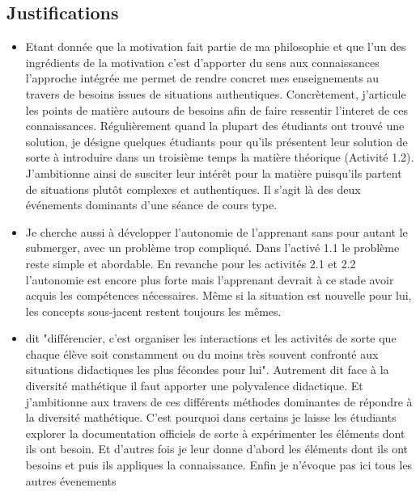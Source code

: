 \subsection{Justifications}
\begin{itemize}
    \item Etant donnée que la motivation fait partie de ma philosophie et que l’un des ingrédients de la motivation c’est d’apporter du sens aux connaissances l’approche intégrée me permet de rendre concret mes enseignements au travers de besoins issues de situations authentiques. Concrètement, j'articule les points de matière autours de besoins afin de faire ressentir l'interet de ces connaissances. Régulièrement quand la plupart des étudiants ont trouvé une solution, je désigne quelques étudiants pour qu’ils présentent leur solution de sorte à introduire dans un troisième temps la matière théorique (Activité 1.2). J’ambitionne ainsi de susciter leur intérêt pour la matière puisqu’ils partent de situations plutôt complexes et authentiques. Il s’agit là des deux événements dominants d’une séance de cours type.
    \item Je cherche aussi à développer l’autonomie de l’apprenant sans pour autant le submerger, avec un problème trop compliqué. Dans l’activé 1.1 le problème reste simple et abordable. En revanche pour les activités 2.1 et 2.2 l’autonomie est encore plus forte mais l’apprenant devrait à ce stade avoir acquis les compétences nécessaires. Même si la situation est nouvelle pour lui, les concepts sous-jacent restent toujours les mêmes.
    \item \cite{perrenoud1992differenciation} dit "différencier, c’est organiser les interactions et les activités de sorte que chaque élève soit constamment ou du moins très souvent confronté aux situations didactiques les plus fécondes pour lui". Autrement dit face à la diversité mathétique il faut apporter une polyvalence didactique. Et j’ambitionne aux travers de ces différents méthodes dominantes de répondre à la diversité mathétique. C’est pourquoi dans certains je laisse les étudiants explorer la documentation officiels de sorte à expérimenter les éléments dont ils ont besoin. Et d’autres fois je leur donne d’abord les éléments dont ils ont besoins et puis ils appliques la connaissance. Enfin je n'évoque pas ici tous les autres évenements

\end{itemize}

